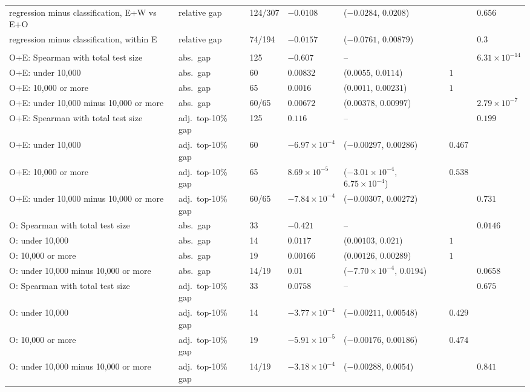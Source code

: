 {\begin{longtable}{>{\raggedright\arraybackslash}p{4.1cm}>{\raggedright\arraybackslash}p{1.9cm}p{1.1cm}p{1.9cm}p{3.5cm}p{0.9cm}p{1.6cm}}
regression minus classification, E+W vs E+O & relative gap & 124/307 & $-0.0108$ & ($-0.0284$, $0.0208$) &  & $0.656$ \\
regression minus classification, within E & relative gap & 74/194 & $-0.0157$ & ($-0.0761$, $0.00879$) &  & $0.3$ \\
\midrule
\multicolumn{7}{l}{\textbf{S2}} \\
O+E: Spearman with total test size & abs.\ gap & 125 & $-0.607$ & -- &  & $6.31\times10^{-14}$ \\
O+E: under 10,000 & abs.\ gap & 60 & $0.00832$ & ($0.0055$, $0.0114$) & $1$ &  \\
O+E: 10,000 or more & abs.\ gap & 65 & $0.0016$ & ($0.0011$, $0.00231$) & $1$ &  \\
O+E: under 10,000 minus 10,000 or more & abs.\ gap & 60/65 & $0.00672$ & ($0.00378$, $0.00997$) &  & $2.79\times10^{-7}$ \\
O+E: Spearman with total test size & adj.\ top-10\% gap & 125 & $0.116$ & -- &  & $0.199$ \\
O+E: under 10,000 & adj.\ top-10\% gap & 60 & $-6.97\times10^{-4}$ & ($-0.00297$, $0.00286$) & $0.467$ &  \\
O+E: 10,000 or more & adj.\ top-10\% gap & 65 & $8.69\times10^{-5}$ & ($-3.01\times10^{-4}$, $6.75\times10^{-4}$) & $0.538$ &  \\
O+E: under 10,000 minus 10,000 or more & adj.\ top-10\% gap & 60/65 & $-7.84\times10^{-4}$ & ($-0.00307$, $0.00272$) &  & $0.731$ \\
O: Spearman with total test size & abs.\ gap & 33 & $-0.421$ & -- &  & $0.0146$ \\
O: under 10,000 & abs.\ gap & 14 & $0.0117$ & ($0.00103$, $0.021$) & $1$ &  \\
O: 10,000 or more & abs.\ gap & 19 & $0.00166$ & ($0.00126$, $0.00289$) & $1$ &  \\
O: under 10,000 minus 10,000 or more & abs.\ gap & 14/19 & $0.01$ & ($-7.70\times10^{-4}$, $0.0194$) &  & $0.0658$ \\
O: Spearman with total test size & adj.\ top-10\% gap & 33 & $0.0758$ & -- &  & $0.675$ \\
O: under 10,000 & adj.\ top-10\% gap & 14 & $-3.77\times10^{-4}$ & ($-0.00211$, $0.00548$) & $0.429$ &  \\
O: 10,000 or more & adj.\ top-10\% gap & 19 & $-5.91\times10^{-5}$ & ($-0.00176$, $0.00186$) & $0.474$ &  \\
O: under 10,000 minus 10,000 or more & adj.\ top-10\% gap & 14/19 & $-3.18\times10^{-4}$ & ($-0.00288$, $0.0054$) &  & $0.841$ \\

\end{longtable}}
